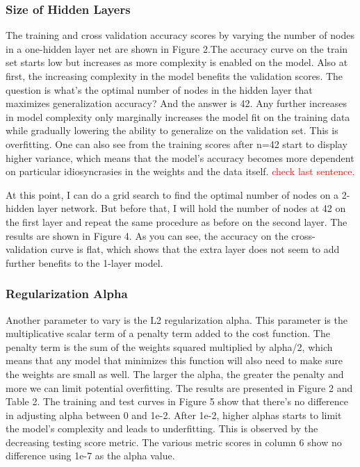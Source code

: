\documentclass{article}
\newcommand\todo[1]{\textcolor{red}{#1}}
\begin{document}
\subsubsection*{Size of Hidden Layers}
The training and cross validation accuracy scores by varying the number of nodes in a one-hidden layer net are shown in Figure 2.The accuracy curve on the train set starts low but increases as more complexity is enabled on the model. Also at first, the increasing complexity in the model benefits the validation scores. The question is what's the optimal number of nodes in the hidden layer that maximizes generalization accuracy? And the answer is 42. Any further increases in model complexity only marginally increases the model fit on the training data while gradually lowering the ability to generalize on the validation set. This is overfitting. One can also see from the training scores after n=42 start to display higher variance, which means that the model's accuracy becomes more dependent on particular idiosyncrasies in the weights and the data itself. \todo{check last sentence.}

At this point, I can do a grid search to find the optimal number of nodes on a 2-hidden layer network. But before that, I will hold the number of nodes at 42 on the first layer and repeat the same procedure as before on the second layer. The results are shown in Figure 4. As you can see, the accuracy on the cross-validation curve is flat, which shows that the extra layer does not seem to add further benefits to the 1-layer model. 

\subsubsection*{Regularization Alpha}

Another parameter to vary is the L2 regularization alpha. This parameter is the multiplicative scalar term of a penalty term added to the cost function. The penalty term is the sum of the weights squared multiplied by alpha/2, which means that any model that minimizes this function will also need to make sure the weights are small as well. The larger the alpha, the greater the penalty and more we can limit potential overfitting. The results are presented in Figure 2 and Table 2. The training and test curves in Figure 5 show that there's no difference in adjusting alpha between 0 and 1e-2. After 1e-2, higher alphas starts to limit the model's complexity and leads to underfitting. This is observed by the decreasing testing score metric. The various metric scores in column 6 show no difference using 1e-7 as the alpha value. 
\end{document}
